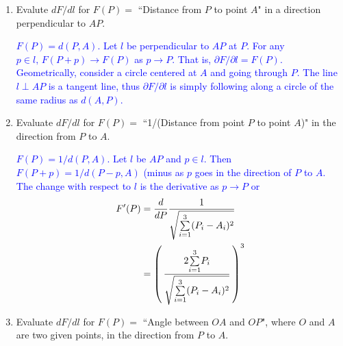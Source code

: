 \documentclass[12pt,a4paper]{report}
\newcommand{\BLUE}[1]{\textcolor{blue}{#1}}
\begin{document}
\begin{enumerate}[label=\textbf{\arabic*.}]
\begin{center}
\end{center}
we can clearly see that $\vec{B}\cdot\vec{j} = 4$ and $\vec{A}\cdot\vec{j} = 2$ and $(\vec{A}+\vec{B})\cdot\vec{j} = 6$.\\

This allows for any inner product of the form $(\vec{a}+\vec{B})\cdot(\vec{i}+\vec{j})$.  For the general case of $\alpha \vec{i}+\beta\vec{j}$ it is easy to see that $\alpha$ and $\beta$ also distribute due to the Distribution Law of Algebra.

\item Evalute $d F/dl$ for $F(P) = $ ``Distance from $P$ to point $A$" in a direction perpendicular to $AP$.

\BLUE{$F(P) = d(P, A)$.  Let $l$ be perpendicular to $AP$ at $P$.  For any $p \in l,\, F(P+p) \to F(P)$ as $p \to P$.  That is, $\partial F/\partial l = F(P)$.  Geometrically, consider a circle centered at $A$ and going through $P$.  The line $l \perp AP$ is a tangent line, thus $\partial F/\partial l$ is simply following along a circle of the same radius as $d(A,P)$.
}

\item Evaluate $dF/dl$ for $F(P) = $ ``1/(Distance from point $P$ to point $A$)" in the direction from $P$ to $A$.

\BLUE{$F(P) = 1/d(P,A)$.  Let $l$ be $AP$ and $p\in l$.  Then $F(P+p)=1/d(P-p,A)$ (minus as $p$ goes in the direction of $P$ to $A$.  The change with respect to $l$ is the derivative as $p \to P$ or 
\begin{align*}
	F'(P) &= \frac{d}{dP} \frac{1}{\sqrt{\underset{i=1}{\overset{3}{\sum}} (P_i-A_i)^2}} \\
		&= \left (\, \frac{2\underset{i=1}{\overset{3}{\sum}}P_i}{\sqrt{\underset{i=1}{\overset{3}{\sum}} (P_i-A_i)^2}} \,\right )^3
\end{align*}
}

\item Evaluate $dF/dl$ for $F(P) =$ ``Angle between $OA$ and $OP$", where $O$ and $A$ are two given points, in the direction from $P$ to $A$.


\end{enumerate}
\end{document}
